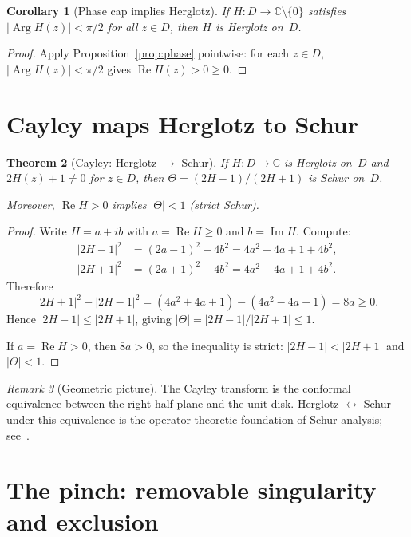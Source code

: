 \documentclass[11pt]{amsart}
\newtheorem{theorem}{Theorem}[section]
\newtheorem{corollary}[theorem]{Corollary}
\theoremstyle{definition}
\theoremstyle{remark}
\newtheorem{remark}[theorem]{Remark}
\newcommand{\C}{\mathbb{C}}
\DeclareMathOperator{\re}{Re}
\DeclareMathOperator{\im}{Im}
\DeclareMathOperator{\Arg}{Arg}
\begin{document}
\begin{corollary}[Phase cap implies Herglotz]\label{cor:phase-herglotz}
If $H:D\to\C\setminus\{0\}$ satisfies $|\Arg H(z)|<\pi/2$ for
all $z\in D$, then $H$ is Herglotz on~$D$.
\end{corollary}
\begin{proof}
Apply Proposition~\ref{prop:phase} pointwise: for each $z\in D$,
$|\Arg H(z)|<\pi/2$ gives $\re H(z)>0\ge 0$.
\end{proof}

\section{Cayley maps Herglotz to Schur}\label{sec:cayley}

\begin{theorem}[Cayley: Herglotz $\to$ Schur]\label{thm:cayley}
If $H:D\to\C$ is Herglotz on~$D$ and $2H(z)+1\ne 0$ for $z\in D$,
then $\Theta=(2H-1)/(2H+1)$ is Schur on~$D$.

Moreover, $\re H>0$ implies $|\Theta|<1$ (strict Schur).
\end{theorem}
\begin{proof}
Write $H=a+ib$ with $a=\re H\ge 0$ and $b=\im H$.  Compute:
\begin{align*}
|2H-1|^2 &= (2a-1)^2+4b^2 = 4a^2-4a+1+4b^2,\\
|2H+1|^2 &= (2a+1)^2+4b^2 = 4a^2+4a+1+4b^2.
\end{align*}
Therefore
\[
|2H+1|^2-|2H-1|^2=(4a^2+4a+1)-(4a^2-4a+1)=8a\ge 0.
\]
Hence $|2H-1|\le|2H+1|$, giving
$|\Theta|=|2H-1|/|2H+1|\le 1$.

If $a=\re H>0$, then $8a>0$, so the inequality is strict:
$|2H-1|<|2H+1|$ and $|\Theta|<1$.
\end{proof}

\begin{remark}[Geometric picture]
The Cayley transform is the conformal equivalence between the right
half-plane and the unit disk.  Herglotz $\leftrightarrow$ Schur under
this equivalence is the operator-theoretic foundation of Schur analysis;
see~\cite{RR,AM}.
\end{remark}

\section{The pinch: removable singularity and exclusion}\label{sec:pinch}
\end{document}
